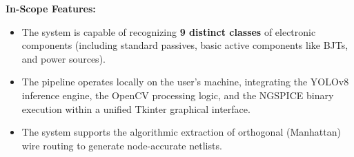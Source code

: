 \vspace{0.5cm}
\noindent \textbf{In-Scope Features:}
\begin{itemize}
    \item The system is capable of recognizing \textbf{9 distinct classes} of electronic components (including standard passives, basic active components like BJTs, and power sources).
    \item The pipeline operates locally on the user's machine, integrating the YOLOv8 inference engine, the OpenCV processing logic, and the NGSPICE binary execution within a unified Tkinter graphical interface.
    \item The system supports the algorithmic extraction of orthogonal (Manhattan) wire routing to generate node-accurate netlists.
\end{itemize}
